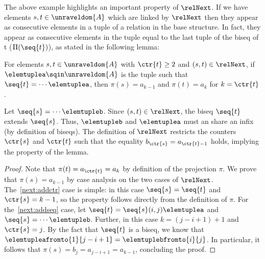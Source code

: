 The above example highlights an important property of $\relNext$.
If we have elements $s,t \in \unraveldom{A}$ which are linked by $\relNext$ then they appear as consecutive elements in a tuple of a relation in the base structure.
In fact, they appear as consecutive elements in the tuple equal to the last tuple of the biseq of t (\ie $\Pi(\seq{t})$), as stated in the following lemma:
\begin{lemma}
For elements $s, t \in \unraveldom{A}$ with $\ctr{t} \ge 2$ and $(s,t) \in \relNext$, if $\elemtuplea \sqin \unraveldom{A}$ is the tuple such that $\seq{t} = \cdots \elemtuplea$, then $\pi(s) = a_{k-1}$ and $\pi(t) = a_{k}$ for $k = \ctr{t}$.
\end{lemma}
\begin{proofsketch}
  Let $\seq{s} = \cdots \elemtupleb$.
  Since $(s,t) \in \relNext$, the biseq $\seq{t}$ extends $\seq{s}$.
  Thus, $\elemtupleb$ and $\elemtuplea$ must an share an infix (by definition of biseqs).
  The definition of $\relNext$ restricts the counters $\ctr{s}$ and $\ctr{t}$ such that the equality $b_{\ctr{s}} = a_{\ctr{t}-1}$ holds, implying the property of the lemma.
\end{proofsketch}
\begin{proof}
  Note that $\pi(t) = a_{\ctr{t}} = a_{k}$ by definition of the projection $\pi$.
  We prove that $\pi(s) = a_{k-1}$ by case analysis on the two cases of $\relNext$.
  The~\ref{next:addctr} case is simple: in this case $\seq{s} = \seq{t}$ and $\ctr{s} = k - 1$, so the property follows directly from the definition of $\pi$.
  For the~\ref{next:addseq} case, let $\seq{t} = \seq{s} (i,j) \elemtuplea$ and $\seq{s} = \cdots \elemtupleb$.
  Further, in this case $k = (j - i + 1) + 1$ and $\ctr{s} = j$.
  By the fact that $\seq{t}$ is a biseq, we know that $\elemtupleafromto{1}{j-i+1} = \elemtuplebfromto{i}{j}$.
  In particular, it follows that $\pi(s) = b_{j} = a_{j-i+1} = a_{k-1}$, concluding the proof.
\end{proof}

